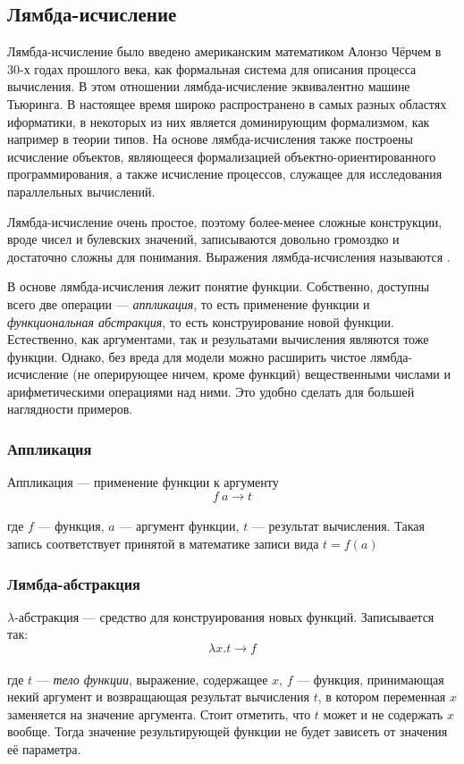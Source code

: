 \documentclass[a4paper, 12pt, titlepage, twoside]{article}
\begin{document}
\subsection{Лямбда-исчисление}
Лямбда-исчисление было введено американским математиком Алонзо Чёрчем в 30-х годах прошлого века, как формальная система для описания процесса вычисления. В этом отношении лямбда-исчисление эквивалентно машине Тьюринга. В настоящее время широко распространено в самых разных областях иформатики, в некоторых из них является доминирующим формализмом, как например в теории типов. На основе лямбда-исчисления также построены исчисление объектов, являющееся формализацией объектно-ориентированного программирования, а также исчисление процессов, служащее для исследования параллельных вычислений.

Лямбда-исчисление очень простое, поэтому более-менее сложные конструкции, вроде чисел и булевских значений, записываются довольно громоздко и достаточно сложны для понимания. Выражения лямбда-исчисления называются .

В основе лямбда-исчисления лежит понятие функции. Собственно, доступны всего две операции --- \textit{аппликация}, то есть применение функции и \textit{функциональная абстракция}, то есть конструирование новой функции. Естественно, как аргументами, так и резульатами вычисления являются тоже функции. Однако, без вреда для модели можно расширить чистое лямбда-исчисление (не оперирующее ничем, кроме функций) вещественными числами и арифметическими операциями над ними. Это удобно сделать для большей наглядности примеров.

\subsubsection{Аппликация}
Аппликация --- применение функции к аргументу
\[f\ a\longrightarrow t\]\\
где $f$ --- функция, $a$ --- аргумент функции, $t$ --- результат вычисления. Такая запись соответствует принятой в математике записи вида $t = f(a)$

\subsubsection{Лямбда-абстракция}
$\lambda$-абстракция --- средство для конструирования новых функций. Записывается так:
\[\lambda x.t\longrightarrow f\]\\
где $t$ --- \textit{тело функции}, выражение, содержащее $x$, $f$ --- функция, принимающая некий аргумент и возвращающая результат вычисления $t$, в котором переменная $x$ заменяется на значение аргумента. Стоит отметить, что $t$ может и не содержать $x$ вообще. Тогда значение результирующей функции не будет зависеть от значения её параметра.
\end{document}

